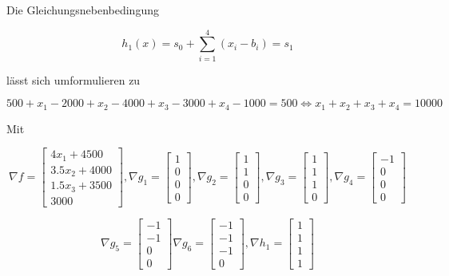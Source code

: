 \documentclass[a4paper, 12pt]{report}
\begin{document}
Die Gleichungsnebenbedingung 

$$ h_1(x) = s_0 + \sum_{i=1}^4 \left( x_i - b_i \right) = s_1 $$

lässt sich umformulieren zu

$$ 500 + x_1 - 2000 + x_2 - 4000 + x_3 - 3000 + x_4 - 1000 = 500 \Leftrightarrow x_1 + x_2 + x_3 + x_4 = 10000 $$

Mit

$$ \nabla f = \begin{bmatrix}4x_1 + 4500\\3.5x_2 + 4000\\1.5x_3 + 3500\\3000\end{bmatrix}, \nabla g_1 = \begin{bmatrix}1\\0\\0\\0\end{bmatrix}, \nabla g_2 = \begin{bmatrix}1\\1\\0\\0\end{bmatrix}, \nabla g_3 = \begin{bmatrix} 1\\1\\1\\0 \end{bmatrix}, \nabla g_4 = \begin{bmatrix}-1\\0\\0\\0\end{bmatrix} $$

$$ \nabla g_5 = \begin{bmatrix} -1\\-1\\0\\0 \end{bmatrix} \nabla g_6 = \begin{bmatrix}-1\\-1\\-1\\0\end{bmatrix}, \nabla h_1 = \begin{bmatrix}1\\1\\1\\1\end{bmatrix} $$
\end{document}
